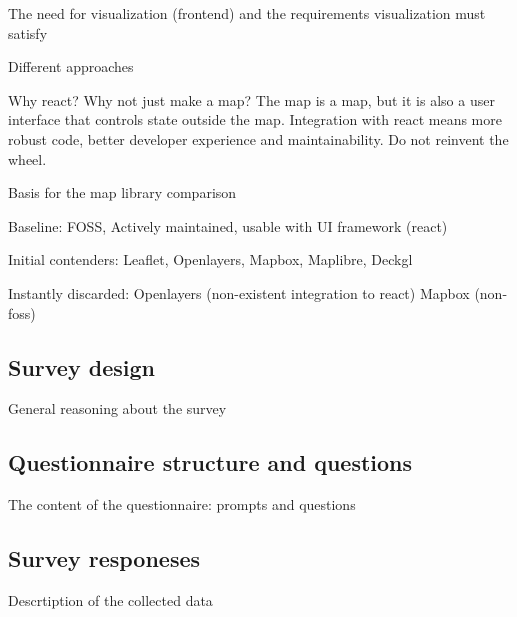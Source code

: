 The need for visualization (frontend) and the requirements visualization must satisfy

Different approaches

Why react? Why not just make a map?
The map is a map, but it is also a user interface that controls state outside the map.
Integration with react means more robust code, better developer experience and maintainability.
Do not reinvent the wheel.

Basis for the map library comparison

Baseline: FOSS, Actively maintained, usable with UI framework (react)

Initial contenders: Leaflet, Openlayers, Mapbox, Maplibre, Deckgl

Instantly discarded: Openlayers (non-existent integration to react) Mapbox (non-foss)








\subsection{Survey design}
General reasoning about the survey

\subsection{Questionnaire structure and questions}
The content of the questionnaire: prompts and questions

\subsection{Survey responeses}
Descrtiption of the collected data
